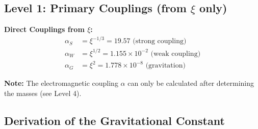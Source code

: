 \documentclass[12pt,a4paper]{article}
\newcommand{\xipar}{\xi}
\newcommand{\alphas}{\alpha_S}
\newcommand{\alphaw}{\alpha_W}
\newcommand{\alphag}{\alpha_G}
\begin{document}
	\subsection{Level 1: Primary Couplings (from $\xi$ only)}
	
	\begin{primary}
		\textbf{Direct Couplings from $\xi$:}
		\begin{align}
			\alphas &= \xipar^{-1/3} = 19.57 \text{ (strong coupling)} \\
			\alphaw &= \xipar^{1/2} = 1.155 \times 10^{-2} \text{ (weak coupling)} \\
			\alphag &= \xipar^{2} = 1.778 \times 10^{-8} \text{ (gravitation)}
		\end{align}
		
		\textbf{Note:} The electromagnetic coupling $\alpha$ can only be calculated after determining the masses (see Level 4).
	\end{primary}
	
	\subsection{Derivation of the Gravitational Constant}
	
\end{document}
